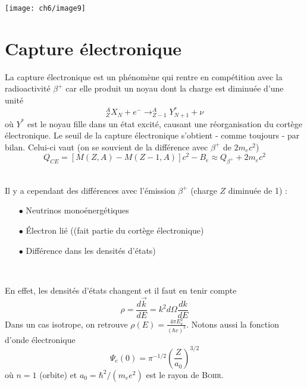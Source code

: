 \newpage
\begin{center}
	\texttt{[image: ch6/image9]}
\end{center}








\section{Capture électronique}
La capture électronique est un phénomène qui rentre en compétition avec la radioactivité $\beta^+$ car elle 
produit un noyau dont la charge est diminuée d'une unité
\begin{equation}
^A_ZX_N + e^- \to ^A_{Z-1}Y^*_{N+1} + \nu
\end{equation}
où $Y^*$ est le noyau fille dans un état excité, causant une réorganisation du cortège électronique. Le seuil
de la capture électronique s'obtient - comme toujours - par bilan. Celui-ci vaut (on se souvient de la 
différence avec $\beta^+$ de $2m_ec^2$)
\begin{equation}
Q_{CE} = [M(Z,A)-M(Z-1,A)]c^2-B_e \approx Q_{\beta^+}+2m_ec^2
\end{equation}\ 

Il y a cependant des différences avec l'émission $\beta^+$ (charge $Z$ diminuée de 1) :
\begin{itemize}
\item[$\bullet$] Neutrinos monoénergétiques
\item[$\bullet$] Électron lié ((fait partie du cortège électronique)
\item[$\bullet$] Différence dans les densités d'états)
\end{itemize}\ 

En effet, les densités d'états changent et il faut en tenir compte
\begin{equation}
\rho = \frac{d\vec{k}}{dE} = k^2d\Omega\frac{dk}{dE}
\end{equation}
Dans un cas isotrope, on retrouve $\rho(E) = \frac{4\pi E_\nu^2}{(\hbar c)^3}$. Notons aussi la 
fonction d'onde électronique
\begin{equation}
\Psi_e(0) = \pi^{-1/2}\left(\dfrac{Z}{a_0}\right)^{3/2}
\end{equation}
où $n=1$ (orbite) et $a_0 = \hbar^2/(m_ee^2)$ est le rayon de \textsc{Bohr}.\\


